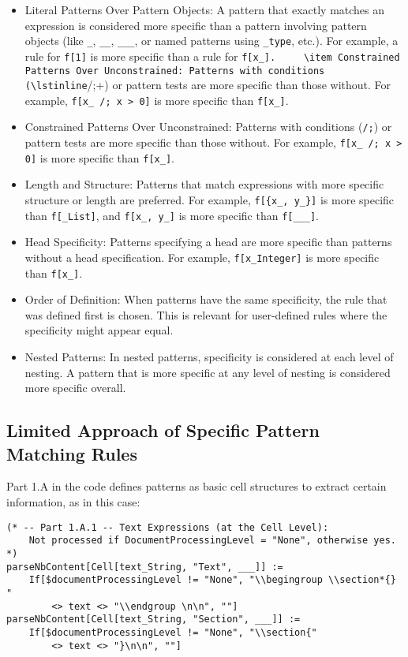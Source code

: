 \begin{itemize}
    \item Literal Patterns Over Pattern Objects: A pattern that exactly matches an expression is considered more specific than a pattern involving pattern objects (like \lstinline+_+, \lstinline+__+, \lstinline+___+, or named patterns using \lstinline+_type+, etc.). For example, a rule for \lstinline+f[1]+ is more specific than a rule for \lstinline+f[x_].
    \item Constrained Patterns Over Unconstrained: Patterns with conditions (\lstinline+/;+) or pattern tests are more specific than those without. For example, \lstinline+f[x_ /; x > 0]+ is more specific than \lstinline+f[x_]+.
    \item Constrained Patterns Over Unconstrained: Patterns with conditions (\lstinline+/;+) or pattern tests are more specific than those without. For example, \lstinline+f[x_ /; x > 0]+ is more specific than \lstinline+f[x_]+.
    \item Length and Structure: Patterns that match expressions with more specific structure or length are preferred. For example, \lstinline+f[{x_, y_}]+ is more specific than \lstinline+f[_List]+, and \lstinline+f[x_, y_]+ is more specific than \lstinline+f[___]+.
    \item Head Specificity: Patterns specifying a head are more specific than patterns without a head specification. For example, \lstinline+f[x_Integer]+ is more specific than \lstinline+f[x_]+.
    \item Order of Definition: When patterns have the same specificity, the rule that was defined first is chosen. This is relevant for user-defined rules where the specificity might appear equal.
    \item Nested Patterns: In nested patterns, specificity is considered at each level of nesting. A pattern that is more specific at any level of nesting is considered more specific overall.
\end{itemize}

\subsection{Limited Approach of Specific Pattern Matching Rules}

Part 1.A in the code defines patterns as basic cell structures to extract certain information, as in this case:

\begin{verbatim}
(* -- Part 1.A.1 -- Text Expressions (at the Cell Level): 
    Not processed if DocumentProcessingLevel = "None", otherwise yes. *)
parseNbContent[Cell[text_String, "Text", ___]] := 
    If[$documentProcessingLevel != "None", "\\begingroup \\section*{} " 
        <> text <> "\\endgroup \n\n", ""]
parseNbContent[Cell[text_String, "Section", ___]] := 
    If[$documentProcessingLevel != "None", "\\section{" 
        <> text <> "}\n\n", ""]
\end{verbatim}

